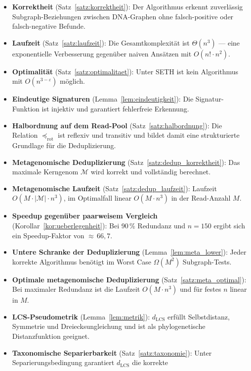 ﻿\documentclass[a4paper,12pt]{article}
\theoremstyle{definition}
\begin{document}
\begin{itemize}
	\item \textbf{Korrektheit} (Satz~\ref{satz:korrektheit}): Der Algorithmus
	erkennt zuverl\"{a}ssig Subgraph-Beziehungen zwischen DNA-Graphen ohne
	falsch-positive oder falsch-negative Befunde.
	\item \textbf{Laufzeit} (Satz~\ref{satz:laufzeit}): Die Gesamtkomplexit\"{a}t
	ist $\Theta(n^3)$ --- eine exponentielle Verbesserung gegen\"{u}ber
	naiven Ans\"{a}tzen mit $O(n! \cdot n^2)$.
	\item \textbf{Optimalit\"{a}t} (Satz~\ref{satz:optimalitaet}): Unter SETH
	ist kein Algorithmus mit $O(n^{3-\varepsilon})$ m\"{o}glich.
	\item \textbf{Eindeutige Signaturen} (Lemma~\ref{lem:eindeutigkeit}):
	Die Signatur-Funktion ist injektiv und garantiert fehlerfreie Erkennung.
	\item \textbf{Halbordnung auf dem Read-Pool} (Satz~\ref{satz:halbordnung}):
	Die Relation $\preceq_{\mathrm{rot}}$ ist reflexiv und transitiv und
	bildet damit eine strukturierte Grundlage f\"{u}r die Deduplizierung.
	\item \textbf{Metagenomische Deduplizierung} (Satz~\ref{satz:dedup_korrektheit}):
	Das maximale Kerngenom $\mathcal{M}$ wird korrekt und vollst\"{a}ndig berechnet.
	\item \textbf{Metagenomische Laufzeit} (Satz~\ref{satz:dedup_laufzeit}):
	Laufzeit $O(M \cdot |\mathcal{M}| \cdot n^3)$, im Optimalfall linear
	$O(M \cdot n^3)$ in der Read-Anzahl $M$.
	\item \textbf{Speedup gegen\"{u}ber paarweisem Vergleich}
	(Korollar~\ref{kor:ueberlegenheit}): Bei 90\,\% Redundanz und $n = 150$
	ergibt sich ein Speedup-Faktor von ${\approx}\,66{,}7$.
	\item \textbf{Untere Schranke der Deduplizierung}
	(Lemma~\ref{lem:meta_lower}): Jeder korrekte Algorithmus ben\"{o}tigt
	im Worst Case $\Omega(M^2)$ Subgraph-Tests.
	\item \textbf{Optimale metagenomische Deduplizierung}
	(Satz~\ref{satz:meta_optimal}): Bei maximaler Redundanz ist die
	Laufzeit $O(M \cdot n^3)$ und f\"{u}r festes $n$ linear in $M$.
	\item \textbf{LCS-Pseudometrik} (Lemma~\ref{lem:metrik}):
	$d_{\mathrm{LCS}}$ erf\"{u}llt Selbstdistanz, Symmetrie und
	Dreiecksungleichung und ist als phylogenetische Distanzfunktion geeignet.
	\item \textbf{Taxonomische Separierbarkeit} (Satz~\ref{satz:taxonomie}):
	Unter Separierungsbedingung garantiert $d_{\mathrm{LCS}}$ die korrekte

\end{itemize}
\end{document}
